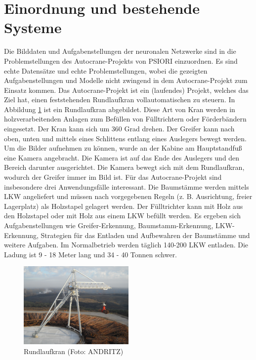 	\section{Einordnung und bestehende Systeme}
	\label{sec:BestehendesSystem}
	Die Bilddaten und Aufgabenstellungen der neuronalen Netzwerke sind in die Problemstellungen des Autocrane-Projekts \cite{PSIORIGmbH.2020} von PSIORI einzuordnen. Es sind echte Datensätze und echte Problemstellungen, wobei die gezeigten Aufgabenstellungen und Modelle nicht zwingend in dem Autocrane-Projekt zum Einsatz kommen. Das Autocrane-Projekt ist ein (laufendes) Projekt, welches das Ziel hat, einen feststehenden Rundlaufkran vollautomatischen zu steuern. In Abbildung \ref{img:CircularCrane} ist ein Rundlaufkran abgebildet. Diese Art von Kran werden in holzverarbeitenden Anlagen zum Befüllen von Fülltrichtern oder Förderbändern eingesetzt. Der Kran kann sich um 360 Grad drehen. Der Greifer kann nach oben, unten und mittels eines Schlittens entlang eines Auslegers bewegt werden. Um die Bilder aufnehmen zu können, wurde an der Kabine am Hauptstandfuß eine Kamera angebracht. Die Kamera ist auf das Ende des Auslegers und den Bereich darunter ausgerichtet. Die Kamera bewegt sich mit dem Rundlaufkran, wodurch der Greifer immer im Bild ist. Für das Autocrane-Projekt sind insbesondere drei Anwendungsfälle interessant. Die Baumstämme werden mittels LKW angeliefert und müssen nach vorgegebenen Regeln (z. B. Ausrichtung, freier Lagerplatz) als Holzstapel gelagert werden. Der Fülltrichter kann mit Holz aus den Holzstapel oder mit Holz aus einem LKW befüllt werden. Es ergeben sich Aufgabenstellungen wie Greifer-Erkennung, Baumstamm-Erkennung, LKW-Erkennung, Strategien für das Entladen und Aufbewahren der Baumstämme und weitere Aufgaben. Im Normalbetrieb werden täglich 140-200 LKW entladen. Die Ladung ist 9 - 18 Meter lang und 34 - 40 Tonnen schwer. 
	\begin{figure}[h]
		\centering
		\includegraphics[width=0.5\textwidth, center]{bilder/Grundlagen/Kran_vollstaendig_N1_030.jpg}
		\caption[Rundlaufkran]{Rundlaufkran (Foto: ANDRITZ)}
		\label{img:CircularCrane}
	\end{figure}		

